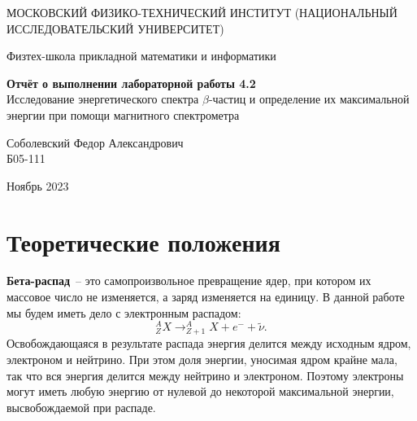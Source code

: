 \documentclass[a4paper,12pt]{article} %
\date{\today}
\begin{document}
\begin{titlepage}
	\begin{center}
		{\large МОСКОВСКИЙ ФИЗИКО-ТЕХНИЧЕСКИЙ ИНСТИТУТ (НАЦИОНАЛЬНЫЙ ИССЛЕДОВАТЕЛЬСКИЙ УНИВЕРСИТЕТ)}
	\end{center}
	\begin{center}
		{\large Физтех-школа прикладной математики и информатики}
	\end{center}
	
	
	\vspace{4.5cm}
	{\huge
		\begin{center}
			{\bf Отчёт о выполнении лабораторной работы 4.2}\\
			Исследование энергетического спектра $\beta$-частиц и определение их максимальной энергии при помощи магнитного спектрометра
		\end{center}
	}
	\vspace{1cm}
	\begin{center}
		{\large Соболевский Федор Александрович \\
			\vspace{0.2cm}
			Б05-111}
	\end{center}
	\vspace{8cm}
	\begin{center}
		  Ноябрь 2023
	\end{center}
\end{titlepage}

\section{Теоретические положения}

\textbf{Бета-распад}~--  это самопроизвольное превращение ядер, при котором их массовое число не изменяется, а заряд изменяется на единицу. В данной работе мы будем иметь дело с электронным распадом:
\begin{equation}
    _{Z}^{A}X \rightarrow _{Z+1}^{A}X + e^{-} + \widetilde{\nu}.
\end{equation}
Освобождающаяся в результате распада энергия делится между исходным ядром, электроном и нейтрино. При этом доля энергии, уносимая ядром крайне мала, так что вся энергия делится между нейтрино и электроном. Поэтому электроны могут иметь любую энергию от нулевой до некоторой максимальной энергии, высвобождаемой при распаде.
		
\end{document}
